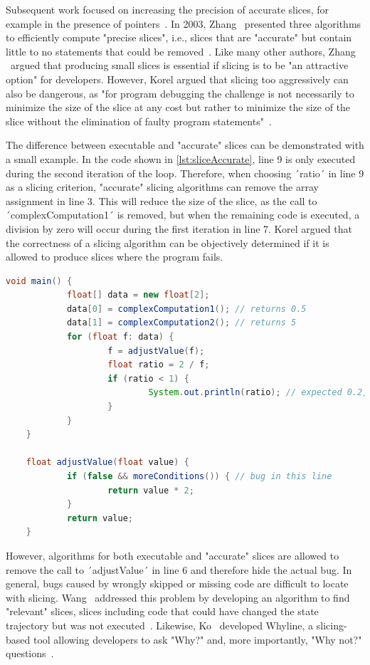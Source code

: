 Subsequent work focused on increasing the precision of accurate slices, for example in the presence of pointers~\cite{atkinson_02_program_slicing_using_dynamic}.
In 2003, Zhang \etal\ presented three algorithms to efficiently compute "precise slices", i.e., slices that are "accurate" but contain little to no statements that could be removed~\cite{zhang_03_precise_dynamic_slicing_algorithms}.
Like many other authors, Zhang \etal\ argued that producing small slices is essential if slicing is to be "an attractive option" for developers.
However, Korel argued that slicing too aggressively can also be dangerous, as
"for program debugging the challenge is not necessarily to minimize the size of the slice at any cost but rather to minimize the size of the slice without the elimination of faulty program statements"~\cite{korel_98_dynamic_program_slicing_methods}.

The difference between executable and "accurate" slices can be demonstrated with a small example.
In the code shown in \cref{lst:sliceAccurate}, line 9 is only executed during the second iteration of the loop.
Therefore, when choosing ´ratio´ in line 9 as a slicing criterion, "accurate" slicing algorithms can remove the array assignment in line 3.
This will reduce the size of the slice, as the call to ´complexComputation1´ is removed, but when the remaining code is executed, a division by zero will occur during the first iteration in line 7.
Korel argued that the correctness of a slicing algorithm can be objectively determined if it is allowed to produce slices where the program fails.

\begin{lstlisting}[float,caption={Code example for accurate slices.},stepnumber=2,numberfirstline=false,label=lst:sliceAccurate,language=Java]
	void main() {
			float[] data = new float[2];
			data[0] = complexComputation1(); // returns 0.5
			data[1] = complexComputation2(); // returns 5
			for (float f: data) {
					f = adjustValue(f);
					float ratio = 2 / f;
					if (ratio < 1) {
							System.out.println(ratio); // expected 0.2, got 0.4
					}
			}
	}

	float adjustValue(float value) {
			if (false && moreConditions()) { // bug in this line
					return value * 2;
			}
			return value;
	}
\end{lstlisting}

However, algorithms for both executable and "accurate" slices are allowed to remove the call to ´adjustValue´ in line 6 and therefore hide the actual bug.
In general, bugs caused by wrongly skipped or missing code are difficult to locate with slicing.
Wang \etal\ addressed this problem by developing an algorithm to find "relevant" slices, slices including code that could have changed the state trajectory but was not executed~\cite{wang_08_dynamic_slicing_on_java}.
Likewise, Ko \etal\ developed Whyline, a slicing-based tool allowing developers to ask "Why?" and, more importantly, "Why not?" questions~\cite{ko_08_debugging_reinvented_asking}.

